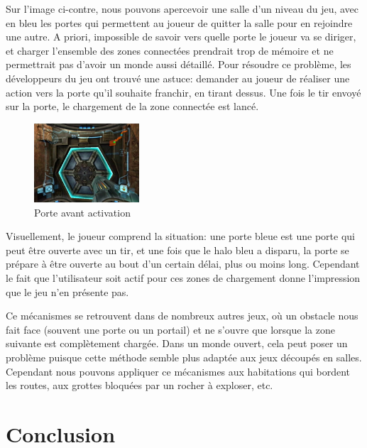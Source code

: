 \documentclass[a4paper, 11pt]{article} %
\begin{document}
Sur l'image ci-contre, nous pouvons apercevoir une salle d'un niveau du jeu, avec en bleu les portes qui permettent au joueur de quitter la salle pour en rejoindre une autre. A priori, impossible de savoir vers quelle porte le joueur va se diriger, et charger l'ensemble des zones connectées prendrait trop de mémoire et ne permettrait pas d'avoir un monde aussi détaillé. Pour résoudre ce problème, les développeurs du jeu ont trouvé une astuce: demander au joueur de réaliser une action vers la porte qu'il souhaite franchir, en tirant dessus. Une fois le tir envoyé sur la porte, le chargement de la zone connectée est lancé.

\begin{figure}
\begin{center}
\includegraphics[width=0.35\textwidth]{images/metroid-prime_door.png}
\end{center}
\caption{Porte avant activation}
\end{figure}
Visuellement, le joueur comprend la situation: une porte bleue est une porte qui peut être ouverte avec un tir, et une fois que le halo bleu a disparu, la porte se prépare à être ouverte au bout d'un certain délai, plus ou moins long. Cependant le fait que l'utilisateur soit actif pour ces zones de chargement donne l'impression que le jeu n'en présente pas.

Ce mécanismes se retrouvent dans de nombreux autres jeux, où un obstacle nous fait face (souvent une porte ou un portail) et ne s'ouvre que lorsque la zone suivante est complètement chargée.
Dans un monde ouvert, cela peut poser un problème puisque cette méthode semble plus adaptée aux jeux découpés en salles. Cependant nous pouvons appliquer ce mécanismes aux habitations qui bordent les routes, aux grottes bloquées par un rocher à exploser, etc.



\newpage
\section{Conclusion}

\newpage



\end{document}
